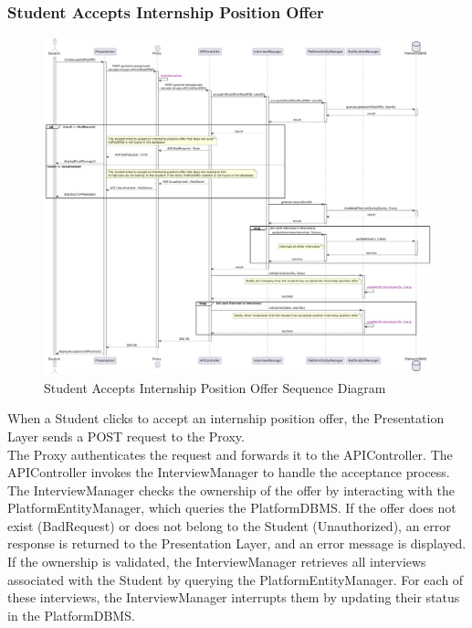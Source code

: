 \subsubsection*{Student Accepts Internship Position Offer}
\begin{figure}[H]
    \centering
    \includegraphics[width=\linewidth]{Latex/Images/DD/SequenceDiagrams/22StudentAcceptsInternshipPositionOffer.png}
    \caption{Student Accepts Internship Position Offer Sequence Diagram}
    \label{fig:studaccintposoff}
\end{figure}
When a Student clicks to accept an internship position offer, the Presentation Layer sends a POST request to the Proxy.\\
The Proxy authenticates the request and forwards it to the APIController. The APIController invokes the InterviewManager to handle the acceptance process. The InterviewManager checks the ownership of the offer by interacting with the PlatformEntityManager, which queries the PlatformDBMS. If the offer does not exist (BadRequest) or does not belong to the Student (Unauthorized), an error response is returned to the Presentation Layer, and an error message is displayed.\\
If the ownership is validated, the InterviewManager retrieves all interviews associated with the Student by querying the PlatformEntityManager. For each of these interviews, the InterviewManager interrupts them by updating their status in the PlatformDBMS.\\
